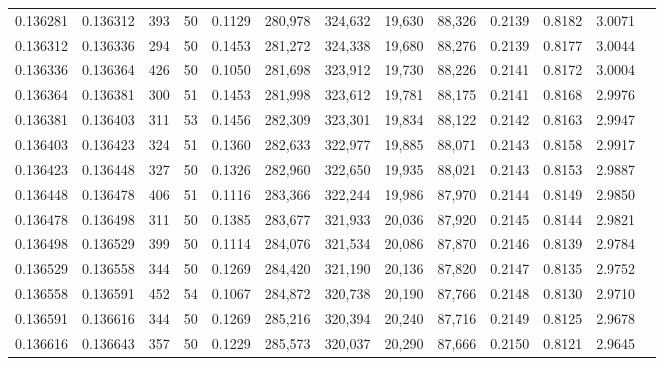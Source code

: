 \begin{tabular}{rrrrrrrrrrrrr}
0.136281 & 0.136312 &   393 &  50 &                                     0.1129 & 280,978 & 324,632 &  19,630 &  88,326 & 0.2139 & 0.8182 & 3.0071 \\
0.136312 & 0.136336 &   294 &  50 &                                     0.1453 & 281,272 & 324,338 &  19,680 &  88,276 & 0.2139 & 0.8177 & 3.0044 \\
0.136336 & 0.136364 &   426 &  50 &                                     0.1050 & 281,698 & 323,912 &  19,730 &  88,226 & 0.2141 & 0.8172 & 3.0004 \\
0.136364 & 0.136381 &   300 &  51 &                                     0.1453 & 281,998 & 323,612 &  19,781 &  88,175 & 0.2141 & 0.8168 & 2.9976 \\
0.136381 & 0.136403 &   311 &  53 &                                     0.1456 & 282,309 & 323,301 &  19,834 &  88,122 & 0.2142 & 0.8163 & 2.9947 \\
0.136403 & 0.136423 &   324 &  51 &                                     0.1360 & 282,633 & 322,977 &  19,885 &  88,071 & 0.2143 & 0.8158 & 2.9917 \\
0.136423 & 0.136448 &   327 &  50 &                                     0.1326 & 282,960 & 322,650 &  19,935 &  88,021 & 0.2143 & 0.8153 & 2.9887 \\
0.136448 & 0.136478 &   406 &  51 &                                     0.1116 & 283,366 & 322,244 &  19,986 &  87,970 & 0.2144 & 0.8149 & 2.9850 \\
0.136478 & 0.136498 &   311 &  50 &                                     0.1385 & 283,677 & 321,933 &  20,036 &  87,920 & 0.2145 & 0.8144 & 2.9821 \\
0.136498 & 0.136529 &   399 &  50 &                                     0.1114 & 284,076 & 321,534 &  20,086 &  87,870 & 0.2146 & 0.8139 & 2.9784 \\
0.136529 & 0.136558 &   344 &  50 &                                     0.1269 & 284,420 & 321,190 &  20,136 &  87,820 & 0.2147 & 0.8135 & 2.9752 \\
0.136558 & 0.136591 &   452 &  54 &                                     0.1067 & 284,872 & 320,738 &  20,190 &  87,766 & 0.2148 & 0.8130 & 2.9710 \\
0.136591 & 0.136616 &   344 &  50 &                                     0.1269 & 285,216 & 320,394 &  20,240 &  87,716 & 0.2149 & 0.8125 & 2.9678 \\
0.136616 & 0.136643 &   357 &  50 &                                     0.1229 & 285,573 & 320,037 &  20,290 &  87,666 & 0.2150 & 0.8121 & 2.9645 \\

\end{tabular}
